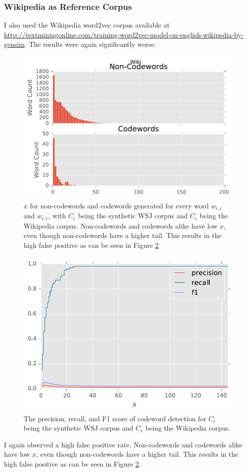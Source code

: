 \subsubsection{Wikipedia as Reference Corpus}

I also used the Wikipedia word2vec corpus available at \url{http://textminingonline.com/training-word2vec-model-on-english-wikipedia-by-gensim}. The results were again significantly worse.

\begin{figure}[h]
\centering
\includegraphics[width=.5\textwidth]{figures/wiki-count.pdf}
\caption{$x$ for non-codewords and codewords generated for every word $w_{i, c}$ and $w_{i, r}$, with $C_c$ being the synthetic WSJ corpus and $C_r$ being the Wikipedia corpus. Non-codewords and codewords alike have low $x$, even though non-codewords have a higher tail. This results in the high false positive as can be seen in Figure \ref{fig-wiki-f1}}
\label{fig-wiki-count}
\end{figure}

\begin{figure}[h]
\centering
\includegraphics[width=.5\textwidth]{figures/wiki-f1.pdf}
\caption{The precision, recall, and F1 score of codeword detection for $C_c$ being the synthetic WSJ corpus and $C_r$ being the Wikipedia corpus.}
\label{fig-wiki-f1}
\end{figure}

I again observed a high false positive rate. Non-codewords and codewords alike have low $x$, even though non-codewords have a higher tail. This results in the high false positive as can be seen in Figure \ref{fig-wiki-f1}.

